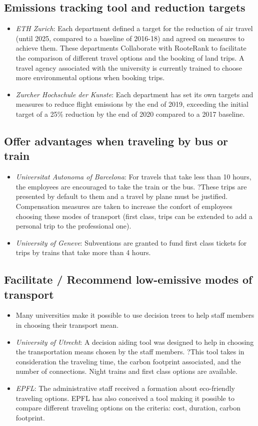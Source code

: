 \documentclass[version=3.21, pagesize, twoside=off, bibliography=totoc, DIV=calc, fontsize=12pt, a4paper, french, english]{scrartcl}
\begin{document}
\subsection{Emissions tracking tool and reduction targets}
\begin{itemize}    
\item \emph{ETH Zurich}: Each department defined a target for the reduction of air travel (until 2025, compared to a baseline of 2016-18) and agreed on measures to achieve them. These departments Collaborate with RooteRank to facilitate the comparison of different travel options and the booking of land trips. A travel agency associated with the university is currently trained to choose more environmental options when booking trips.
\item \emph{Zurcher Hochschule der Kunste}: Each department has set its own targets and measures to reduce flight emissions by the end of 2019, exceeding the initial target of a 25\% reduction by the end of 2020 compared to a 2017 baseline.
\end{itemize}

\subsection{Offer advantages when traveling by bus or train}

\begin{itemize}
\item \emph{Universitat Autonoma of Barcelona}: For travels that take less than 10 hours, the employees are encouraged to take the train or the bus. ?These trips are presented by default to them and a travel by plane must be justified. Compensation measures are taken to increase the confort of employees choosing these modes of transport (first class, trips can be extended to add a personal trip to the professional one).
\item \emph{University of Geneve}: Subventions are granted to fund first class tickets for trips by trains that take more than 4 hours. 
\end{itemize}

\subsection{Facilitate / Recommend low-emissive modes of transport}
\begin{itemize}
\item Many universities make it possible to use decision trees to help staff members in choosing their transport mean. 
\item \emph{University of Utrecht}: A decision aiding tool was designed to help in choosing the transportation means chosen by the staff members. ?This tool takes in consideration the traveling time, the carbon footprint associated, and the number of  connections. Night trains and first class options are available. 
\item \emph{EPFL}: The administrative staff received a formation about eco-friendly traveling options. EPFL has also conceived a tool making it possible to compare different traveling options on the criteria: cost, duration, carbon footprint.
\end{itemize}
\end{document}

